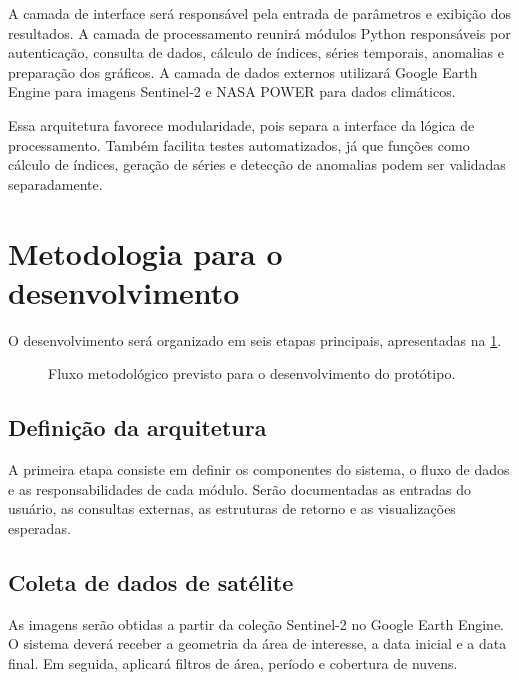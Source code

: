 A camada de interface será responsável pela entrada de parâmetros e exibição dos resultados. A camada de processamento reunirá módulos Python responsáveis por autenticação, consulta de dados, cálculo de índices, séries temporais, anomalias e preparação dos gráficos. A camada de dados externos utilizará Google Earth Engine para imagens Sentinel-2 e NASA POWER para dados climáticos.

Essa arquitetura favorece modularidade, pois separa a interface da lógica de processamento. Também facilita testes automatizados, já que funções como cálculo de índices, geração de séries e detecção de anomalias podem ser validadas separadamente.

\section{Metodologia para o desenvolvimento}

O desenvolvimento será organizado em seis etapas principais, apresentadas na \cref{fig:metodologia}.

\begin{figure}[htb!]
    \centering
    \caption{Fluxo metodológico previsto para o desenvolvimento do protótipo.}
    \label{fig:metodologia}
\end{figure}

\subsection{Definição da arquitetura}

A primeira etapa consiste em definir os componentes do sistema, o fluxo de dados e as responsabilidades de cada módulo. Serão documentadas as entradas do usuário, as consultas externas, as estruturas de retorno e as visualizações esperadas.

\subsection{Coleta de dados de satélite}

As imagens serão obtidas a partir da coleção Sentinel-2 no Google Earth Engine. O sistema deverá receber a geometria da área de interesse, a data inicial e a data final. Em seguida, aplicará filtros de área, período e cobertura de nuvens.

